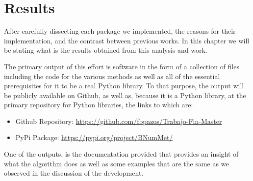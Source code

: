 \chapter{Results}
After carefully dissecting each package we implemented, the reasons for their implementation, and the contrast between previous works. In this chapter we will be stating what is the results obtained from this analysis and work.

The primary output of this effort is software in the form of a collection of files including the code for the various methods as well as all of the essential prerequisites for it to be a real Python library. To that purpose, the output will be publicly available on Github, as well as, because it is a Python library, at the primary repository for Python libraries, the links to which are:

\begin{itemize}
    \item Github Repository: \href{https://github.com/fbpazos/Trabajo-Fin-Master}{https://github.com/fbpazos/Trabajo-Fin-Master}
    \item PyPi Package: \href{https://pypi.org/project/BNumMet/}{https://pypi.org/project/BNumMet/}
\end{itemize}


One of the outputs, is the documentation provided that provides an insight of what the algorithm does as well as some examples that are the same as we observed in the discussion of the development.
